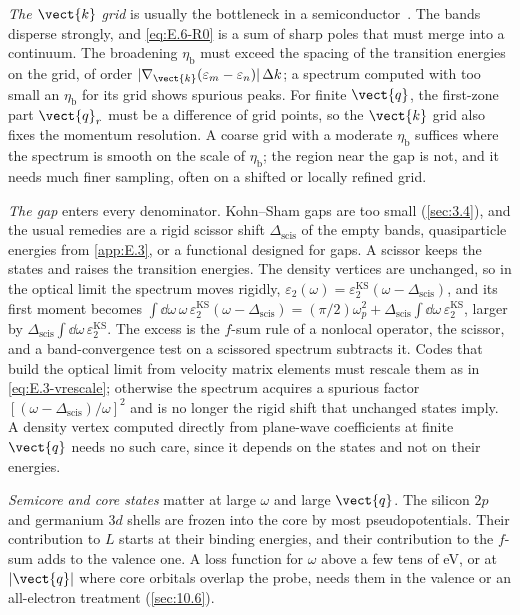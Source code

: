 \emph{The $\vect{k}$ grid} is usually the bottleneck in a semiconductor~\cite{albrecht1998ab}. The bands disperse strongly, and \cref{eq:E.6-R0} is a sum of sharp poles that must merge into a continuum. The broadening $\eta_{\mathrm{b}}$ must exceed the spacing of the transition energies on the grid, of order $|\nabla_{\vect{k}}(\varepsilon_m - \varepsilon_n)|\,\Delta k$; a spectrum computed with too small an $\eta_{\mathrm{b}}$ for its grid shows spurious peaks. For finite $\vect{q}$, the first-zone part $\vect{q}_r$ must be a difference of grid points, so the $\vect{k}$ grid also fixes the momentum resolution. A coarse grid with a moderate $\eta_{\mathrm{b}}$ suffices where the spectrum is smooth on the scale of $\eta_{\mathrm{b}}$; the region near the gap is not, and it needs much finer sampling, often on a shifted or locally refined grid.

\emph{The gap} enters every denominator. Kohn--Sham gaps are too small (\cref{sec:3.4}), and the usual remedies are a rigid scissor shift $\Delta_{\mathrm{scis}}$ of the empty bands, quasiparticle energies from \cref{app:E.3}, or a functional designed for gaps. A scissor keeps the states and raises the transition energies. The density vertices are unchanged, so in the optical limit the spectrum moves rigidly, $\varepsilon_2(\omega) = \varepsilon_2^{\mathrm{KS}}(\omega - \Delta_{\mathrm{scis}})$, and its first moment becomes $\int\dd\omega\,\omega\,\varepsilon_2^{\mathrm{KS}}(\omega - \Delta_{\mathrm{scis}}) = (\pi/2)\omega_p^2 + \Delta_{\mathrm{scis}}\int\dd\omega\,\varepsilon_2^{\mathrm{KS}}$, larger by $\Delta_{\mathrm{scis}}\int\dd\omega\,\varepsilon_2^{\mathrm{KS}}$. The excess is the $f$-sum rule of a nonlocal operator, the scissor, and a band-convergence test on a scissored spectrum subtracts it. Codes that build the optical limit from velocity matrix elements must rescale them as in \cref{eq:E.3-vrescale}; otherwise the spectrum acquires a spurious factor $[(\omega - \Delta_{\mathrm{scis}})/\omega]^2$ and is no longer the rigid shift that unchanged states imply. A density vertex computed directly from plane-wave coefficients at finite $\vect{q}$ needs no such care, since it depends on the states and not on their energies.

\emph{Semicore and core states} matter at large $\omega$ and large $\vect{q}$. The silicon $2p$ and germanium $3d$ shells are frozen into the core by most pseudopotentials. Their contribution to $L$ starts at their binding energies, and their contribution to the $f$-sum adds to the valence one. A loss function for $\omega$ above a few tens of eV, or at $|\vect{q}|$ where core orbitals overlap the probe, needs them in the valence or an all-electron treatment (\cref{sec:10.6}).

